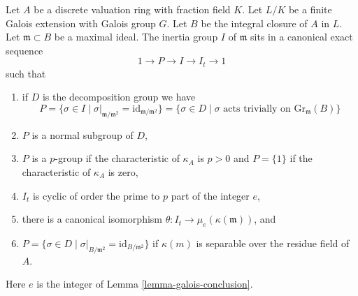 %
\begin{lemma}
\label{lemma-galois-inertia}
Let $A$ be a discrete valuation ring with fraction field $K$.
Let $L/K$ be a finite Galois extension with Galois group $G$.
Let $B$ be the integral closure of $A$ in $L$. Let $\mathfrak m \subset B$
be a maximal ideal. The inertia group $I$ of $\mathfrak m$
sits in a canonical exact sequence
$$
1 \to P \to I \to I_t \to 1
$$
such that
\begin{enumerate}
\item if $D$ is the decomposition group we have
$$
P = \{\sigma \in I \mid \sigma|_{\mathfrak m/\mathfrak m^2} =
\text{id}_{\mathfrak m/\mathfrak m^2}\}
=
\{\sigma \in D \mid \sigma \text{ acts trivially on }\text{Gr}_\mathfrak m(B)\}
$$
\item $P$ is a normal subgroup of $D$,
\item $P$ is a $p$-group if the characteristic of $\kappa_A$ is
$p > 0$ and $P = \{1\}$ if the characteristic of $\kappa_A$ is zero,
\item $I_t$ is cyclic of order the prime to $p$ part of the integer $e$,
\item there is a canonical isomorphism
$\theta : I_t \to \mu_e(\kappa(\mathfrak m))$, and
\item
$P =
\{\sigma \in D \mid \sigma|_{B/\mathfrak m^2} = \text{id}_{B/\mathfrak m^2}\}$
if $\kappa(m)$ is separable over the residue field of $A$.
\end{enumerate}
Here $e$ is the integer of Lemma \ref{lemma-galois-conclusion}.
\end{lemma}

